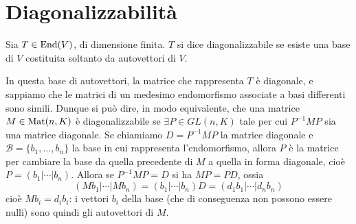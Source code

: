 \section{Diagonalizzabilità}
\begin{definizione}\label{d:endomorfismo-diagonalizzabile}
	Sia $T\in\operatorname{End}(V)$, di dimensione finita.
	$T$ si dice diagonalizzabile se esiste una base di $V$ costituita soltanto da autovettori di $V$.
\end{definizione}
In questa base di autovettori, la matrice che rappresenta $T$ è diagonale, e sappiamo che le matrici di un medesimo endomorfismo associate a basi differenti sono simili.
Dunque si può dire, in modo equivalente, che una matrice $M\in\operatorname{Mat}(n,K)$ è diagonalizzabile se $\exists P\in GL(n,K)$ tale per cui $P^{-1}MP$ sia una matrice diagonale.
Se chiamiamo $D=P^{-1}MP$ la matrice diagonale e $\mathcal B=\{b_1,\dots,b_n\}$ la base in cui rappresenta l'endomorfismo, allora $P$ è la matrice per cambiare la base da quella precedente di $M$ a quella in forma diagonale, cioè $P=(b_1|\cdots|b_n)$.
Allora se $P^{-1}MP=D$ si ha $MP=PD$, ossia
\begin{equation*}
	(Mb_1|\cdots|Mb_n)=(b_1|\cdots|b_n)D=(d_1b_1|\cdots|d_nb_n)
\end{equation*}
cioè $Mb_i=d_ib_i$: i vettori $b_i$ della base (che di conseguenza non possono essere nulli) sono quindi gli autovettori di $M$.

